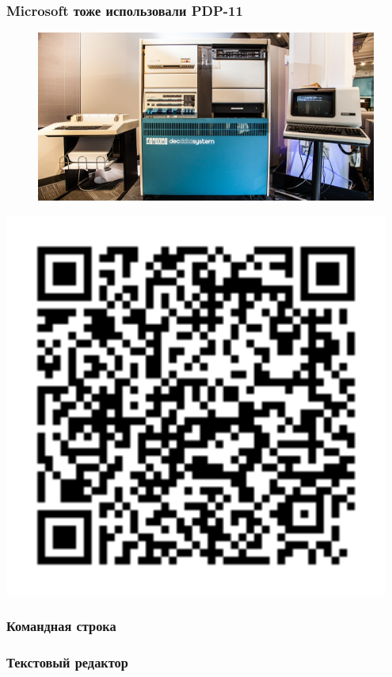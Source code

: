 \documentclass[t,aspectratio=169]{beamer}
\begin{document}
\begin{frame}
    \frametitle{Microsoft тоже использовали PDP-11}
    \begin{minipage}{0.8\textwidth}
        \begin{figure}
            \begin{centering}
                \includegraphics[height=0.7\textheight]{miss-piggy}
            \end{centering}
        \end{figure}
    \end{minipage}
    \begin{minipage}{0.19\textwidth}
        \includegraphics[width=0.95\textwidth]{miss-piggy-qr}
    \end{minipage}
\end{frame}

\begin{frame}
    \frametitle{Командная строка}
\end{frame}

\begin{frame}
    \frametitle{Текстовый редактор}
\end{frame}
\end{document}
